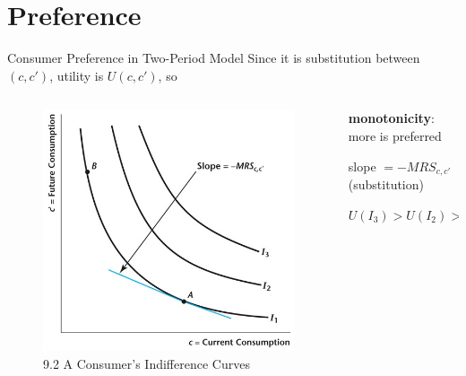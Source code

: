 \documentclass[11pt,aspectratio=169,usenames,dvipsnames]{beamer}
\let\tempone\itemize
\let\temptwo\enditemize
\renewenvironment{itemize}{\tempone\addtolength{\itemsep}{\fill}}{\temptwo}
\let\tempa\enumerate
\let\tempb\endenumerate
\renewenvironment{enumerate}{\tempa\addtolength{\itemsep}{\fill}}{\tempb}
\begin{document}
\section{Preference}
\label{sec:Preference}

\begin{frame}{Consumer Preference in Two-Period Model}
\label{slide:Consumer_Preference_in_Two_Period_Model}
Since it is substitution between $ ( c, c' ) $, utility is $ U( c, c' ) $, so
\begin{columns}
    \begin{column}{0.4\textwidth}
        \begin{figure}
            \caption{\scriptsize 9.2  A Consumer’s Indifference Curves}
            \includegraphics[width=\textwidth]{./figures/Figure9_2.jpg}
        \end{figure}
    \end{column}
    \begin{column}{0.6\textwidth}
        \begin{enumerate}
            \item \textbf{monotonicity}: more is preferred
            \begin{itemize}
                \item slope $ = -MRS_{c, c'}$ (substitution)
                \item $ U( I_{3} ) > U( I_{2} ) > U( I_{1} ) $

\end{itemize}
\end{enumerate}
\end{column}
\end{columns}
\end{frame}
\end{document}
